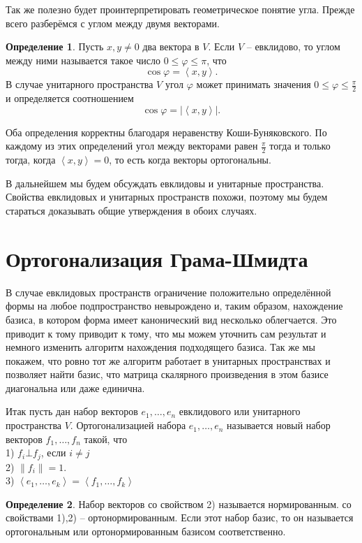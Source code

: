 \documentclass[10pt,a4paper,oneside]{book} %
\theoremstyle{definition}
\newtheorem*{defn}{Определение}
\def\ffi{\varphi}
\def\lan{\left\langle }
\def\ran{\right\rangle}
\def\dfn{\begin{defn}}
\def\edfn{\end{defn}}
\begin{document}
Так же полезно будет проинтерпретировать геометрическое понятие угла. Прежде всего разберёмся с углом между двумя векторами.

\dfn Пусть $x,y\neq 0$ два вектора в $V$. Если $V$ -- евклидово, то углом между ними называется такое число $0\leq\ffi\leq \pi$, что 
$$\cos\ffi = \lan x,y\ran.$$
В случае унитарного пространства $V$ угол $\ffi$ может принимать значения $0\leq \ffi \leq \frac{\pi}{2}$ и определяется соотношением
$$\cos\ffi = |\lan x,y\ran|.$$
\edfn

Оба определения корректны благодаря неравенству Коши-Буняковского. По каждому из этих определений угол между векторами равен $\frac{\pi}{2}$ тогда и только тогда, когда $\lan x,y 
\ran=0$, то есть когда векторы ортогональны. 

В дальнейшем мы будем обсуждать  евклидовы и унитарные пространства. Свойства евклидовых и унитарных пространств похожи, поэтому  мы будем стараться доказывать общие утверждения в обоих случаях.


\section{Ортогонализация Грама-Шмидта}

В случае евклидовых пространств ограничение положительно определённой формы на любое подпространство невырождено и, таким образом, нахождение базиса, в котором форма имеет канонический вид несколько облегчается.  Это приводит к тому приводит к тому, что мы можем уточнить сам результат и немного изменить алгоритм нахождения подходящего базиса. Так же мы покажем, что ровно тот же алгоритм работает в унитарных пространствах и позволяет найти базис, что матрица скалярного произведения в этом базисе диагональна или даже единична.

Итак пусть дан набор векторов $e_1,\dots, e_n $ евклидового или унитарного пространства $V$. Ортогонализацией набора $e_1,\dots,e_n$ называется  новый набор векторов $f_1,\dots,f_n$ такой, что\\
1) $f_i \bot f_j$, если $i\neq j$\\
2) $\|f_i\|=1$.\\
3) $\lan e_1,\dots,e_k\ran=\lan f_1,\dots,f_k\ran$\\


\dfn Набор векторов со свойством 2)
называется нормированным. со свойствами 1),2) -- ортонормированным. Если этот набор базис, то он называется ортогональным или ортонормированным базисом соответственно.
\edfn 
\end{document}
